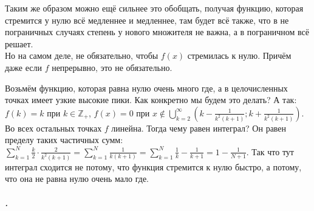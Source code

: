 \documentclass{article}
\begin{document}
\begin{itemize}
        \begin{Comment}
            Таким же образом можно ещё сильнее это обобщать, получая функцию, которая стремится у нулю всё медленнее и медленнее, там будет всё также, что в не пограничных случаях степень у нового множителя не важна, а в пограничном всё решает.\\
            Но на самом деле, не обязательно, чтобы $f(x)$ стремилась к нулю. Причём даже если $f$ непрерывно, это не обязательно.
        \end{Comment}
        \begin{Example}
            Возьмём функцию, которая равна нулю очень много где, а в целочисленных точках имеет узкие высокие пики. Как конкретно мы будем это делать? А так:\\
            $f(k)=k$ при $k\in\mathbb Z_+$, $f(x)=0$ при $x\notin\bigcup\limits_{k=2}^\infty\left(k-\frac1{k^2(k+1)};k+\frac1{k^2(k+1)}\right)$. Во всех остальных точках $f$ линейна. Тогда чему равен интеграл? Он равен пределу таких частичных сумм: $\sum\limits_{k=1}^N\frac k2\cdot\frac2{k^2(k+1)}=\sum\limits_{k=1}^N\frac1{k(k+1)}=\sum\limits_{k=1}^N\frac1k-\frac1{k+1}=1-\frac1{N+1}$. Так что тут интеграл сходится не потому, что функция стремится к нулю быстро, а потому, что она не равна нулю очень мало где.
        \end{Example}
    \end{itemize}
    \subparagraph{.}
\end{document}
